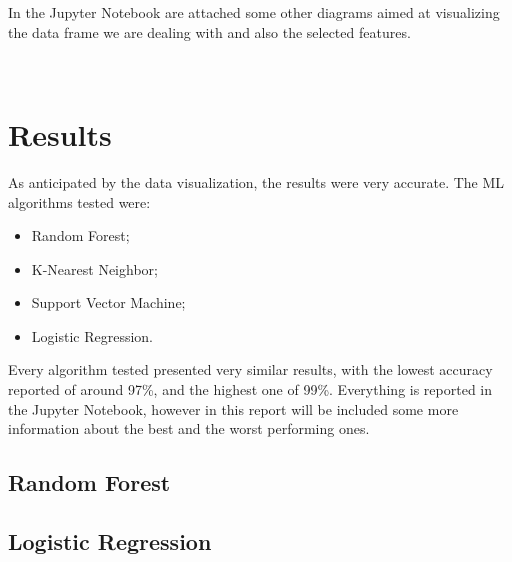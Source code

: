 \documentclass{article}
\begin{document}
In the Jupyter Notebook are attached some other diagrams aimed at visualizing the data frame we are dealing with and also the selected features.

\newpage~\newpage
\section{Results}

As anticipated by the data visualization, the results were very accurate. The ML algorithms tested were:

\begin{itemize}
	\item Random Forest;
	\item K-Nearest Neighbor;
	\item Support Vector Machine;
	\item Logistic Regression.
\end{itemize}
Every algorithm tested presented very similar results, with the lowest accuracy reported of around 97\%, and the highest one of 99\%. Everything is reported in the Jupyter Notebook, however in this report will be included some more information about the best and the worst performing ones.

\subsection[]{Random Forest}

\subsection[]{Logistic Regression}


 
\end{document}
